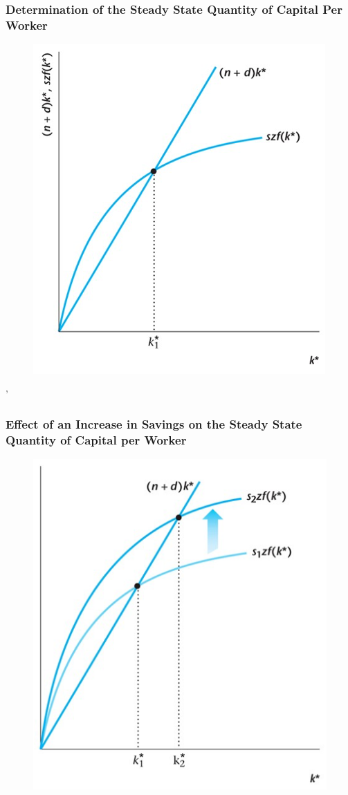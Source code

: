 \documentclass{beamer}
\begin{document}
\begin{frame}
\frametitle[alignment=center]{Determination of the Steady State Quantity of Capital Per Worker}
\begin{figure}
\centering
\includegraphics[scale=0.5]{Figures/W_Fig_7pt14.png}
\end{figure}
\end{frame}
'
\begin{frame}
\frametitle[alignment=center]{Effect of an Increase in Savings on the Steady State Quantity of Capital per Worker}
\begin{figure}
\centering
\includegraphics[scale=0.5]{Figures/W_Fig_7pt15.png}
\end{figure}
\end{frame}
\end{document}
